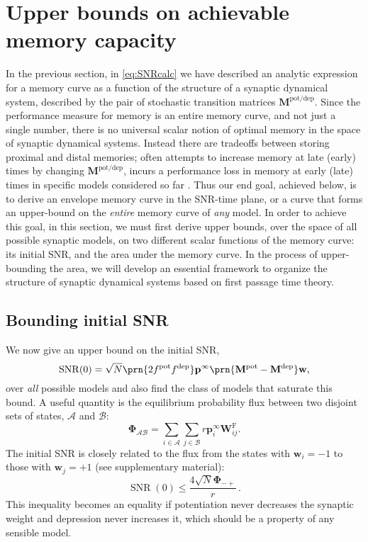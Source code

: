 \documentclass[9pt,twocolumn,twoside,lineno]{pnas-new}
\DeclareMathOperator{\snr}{SNR}
\newcommand{\prob}{\mathbf{p}}
\newcommand{\eq}{\prob^\infty}
\newcommand{\w}{\mathbf{w}}
\newcommand{\W}{\mathbf{W}}
\newcommand{\M}{\mathbf{M}}
\newcommand{\frg}{\W^{\mathrm{F}}}
\newcommand{\F}{\boldsymbol{\Phi}}
\newcommand{\pot}{^{\text{pot}}}
\newcommand{\dep}{^{\text{dep}}}
\newcommand{\potdep}{^{\text{pot/dep}}}
\newcommand{\CA}{\mathcal{A}}
\newcommand{\CB}{\mathcal{B}}
\providecommand\hyperref[2][1]{#2}
\begin{document}
\section{Upper bounds on achievable memory capacity}\label{sec:bounds}

In the previous section, in \cref{eq:SNRcalc} we have described an analytic expression for a memory curve as a function of the structure of a synaptic dynamical system, described by the pair of stochastic transition matrices  $\M\potdep$.
Since the performance measure for memory is an entire memory curve, and not just a single number, there is no universal scalar notion of optimal memory in the space of synaptic dynamical systems.
Instead there are tradeoffs between storing proximal and distal memories;  often attempts to increase memory at late (early) times by changing $\M\potdep$, incurs a performance loss in memory at early (late) times in specific models considered so far \cite{Fusi2005cascade,Fusi2007multistate,Leibold2008serial}.
Thus our end goal, achieved \hyperref[sec:env]{below}, is to derive an envelope memory curve in the SNR-time plane, or a curve that forms an upper-bound on the {\it entire} memory curve of {\it any} model.
In order to achieve this goal, in this section, we must first derive upper bounds, over the space of all possible synaptic models, on two different scalar functions of the memory curve: its initial SNR, and the area under the memory curve.
In the process of upper-bounding the area, we will develop an essential framework to organize the structure of synaptic dynamical systems based on first passage time theory.


\subsection{Bounding initial SNR}\label{sec:initial}

We now give an upper bound on the initial SNR,
%
\begin{equation}\label{eq:init}
  \snr(0) = \sqrt{N}\prn{2 f\pot f\dep} \eq \prn{\M\pot-\M\dep} \w,
\end{equation}
%
over \emph{all} possible models and also find the class of models that saturate this bound.
A useful quantity is the equilibrium probability flux between two disjoint sets of states, $\CA$ and $\CB$:
%
\begin{equation}\label{eq:flux}
  \F_{\CA\CB} = \sum_{i\in\CA} \sum_{j\in\CB} r \eq_i \frg_{ij}.
\end{equation}
%
The initial SNR is closely related to the flux from the states with $\w_i=-1$ to those with $\w_j=+1$ (see supplementary material):
%
\begin{equation}\label{eq:initflux}
  \snr(0) \leq \frac{4\sqrt{N}\F_{-+}}{r}\,.
\end{equation}
%
This inequality becomes an equality if potentiation never decreases the synaptic weight and depression never increases it, which should be a property of any sensible model.
\end{document}
